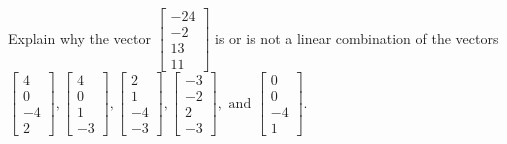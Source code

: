 \documentclass{article}
\begin{document}
\begin{exerciseStatement}
    Explain why the vector \(\left[\begin{array}{c}
-24 \\
-2 \\
13 \\
11
\end{array}\right]\)  is or is not a linear
combination of the vectors \(\left[\begin{array}{c}
4 \\
0 \\
-4 \\
2
\end{array}\right] , \left[\begin{array}{c}
4 \\
0 \\
1 \\
-3
\end{array}\right] , \left[\begin{array}{c}
2 \\
1 \\
-4 \\
-3
\end{array}\right] , \left[\begin{array}{c}
-3 \\
-2 \\
2 \\
-3
\end{array}\right] , \text{ and } \left[\begin{array}{c}
0 \\
0 \\
-4 \\
1
\end{array}\right]\).



  
\end{exerciseStatement}
\end{document}
